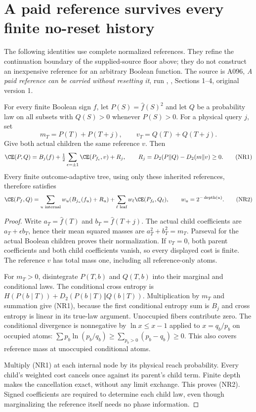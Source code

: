 \section{A paid reference survives every finite no-reset history}
\label{sec:conservative}
The following identities use complete normalized references. They refine
the continuation boundary of the supplied-source floor above; they do not
construct an inexpensive reference for an arbitrary Boolean function.
The source is A096, \emph{A paid reference can be carried without resetting it},
run ,
, Sections 1--4, original version 1.

\begin{lemma}
For every finite Boolean sign $f$, let $P(S)=\widehat f(S)^2$ and
let $Q$ be a probability law on all subsets with $Q(S)>0$ whenever
$P(S)>0$. For a physical query $j$, set
\[
 m_T=P(T)+P(T+j),\qquad v_T=Q(T)+Q(T+j).
\]
Give both actual children the same reference $v$. Then
\[
 \CE(P,Q)=B_j(f)+\tfrac12\sum_{\epsilon=\pm1}
                  \CE(P_{f_\epsilon},v)+R_j,
 \qquad R_j=D_2(P\Vert Q)-D_2(m\Vert v)\ge0.
 \tag{NR1}
\]
Every finite outcome-adaptive tree, using only these inherited
references, therefore satisfies
\[
 \CE(P_f,Q)=\sum_{u\text{ internal}}w_u(B_{j_u}(f_u)+R_u)
                  +\sum_{\ell\text{ leaf}}w_\ell\CE(P_{f_\ell},Q_\ell),
 \qquad w_u=2^{-\operatorname{depth}(u)}.
 \tag{NR2}
\]
\end{lemma}
\begin{proof}
Write $a_T=\widehat f(T)$ and $b_T=\widehat f(T+j)$.
The actual child coefficients are $a_T+\epsilon b_T$, hence their
mean squared masses are $a_T^2+b_T^2=m_T$. Parseval for the actual
Boolean children proves their normalization. If $v_T=0$, both
parent coefficients and both child coefficients vanish, so every
displayed cost is finite. The reference $v$ has total mass one,
including all reference-only atoms.

For $m_T>0$, disintegrate $P(T,b)$ and $Q(T,b)$ into their
marginal and conditional laws. The conditional cross entropy is
$H(P(b\mid T))+D_2(P(b\mid T)\Vert Q(b\mid T))$.
Multiplication by $m_T$ and summation give (NR1), because the first
conditional entropy sum is $B_j$ and cross entropy is linear in
its true-law argument. Unoccupied fibers contribute zero.
The conditional divergence is nonnegative by
$\ln x\le x-1$ applied to $x=q_b/p_b$ on occupied atoms:
$\sum p_b\ln(p_b/q_b)\ge\sum_{p_b>0}(p_b-q_b)\ge0$.
This also covers reference mass at unoccupied conditional atoms.

Multiply (NR1) at each internal node by its physical reach
probability. Every child's weighted cost cancels once against
its parent's child term. Finite depth makes the cancellation exact,
without any limit exchange. This proves (NR2). Signed coefficients
are required to determine each child law, even though marginalizing
the reference itself needs no phase information.
\end{proof}

